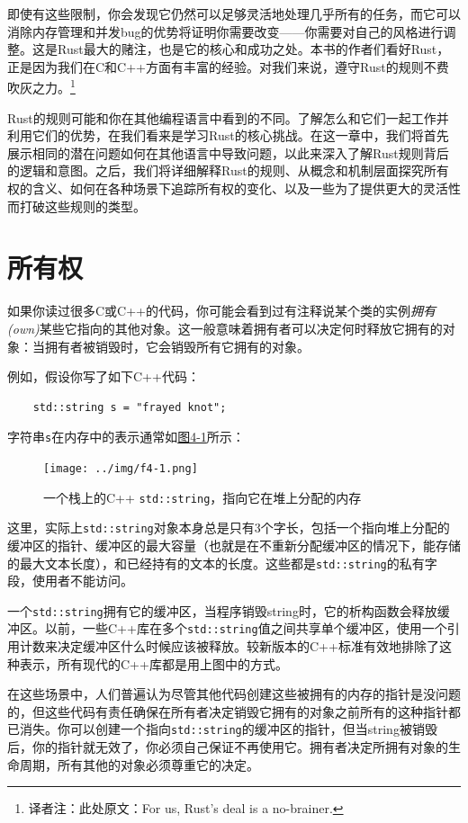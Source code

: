 即使有这些限制，你会发现它仍然可以足够灵活地处理几乎所有的任务，而它可以消除内存管理和并发bug的优势将证明你需要改变——你需要对自己的风格进行调整。这是Rust最大的赌注，也是它的核心和成功之处。本书的作者们看好Rust，正是因为我们在C和C++方面有丰富的经验。对我们来说，遵守Rust的规则不费吹灰之力。\footnote{译者注：此处原文：For us, Rust's deal is a no-brainer.}

Rust的规则可能和你在其他编程语言中看到的不同。了解怎么和它们一起工作并利用它们的优势，在我们看来是学习Rust的核心挑战。在这一章中，我们将首先展示相同的潜在问题如何在其他语言中导致问题，以此来深入了解Rust规则背后的逻辑和意图。之后，我们将详细解释Rust的规则、从概念和机制层面探究所有权的含义、如何在各种场景下追踪所有权的变化、以及一些为了提供更大的灵活性而打破这些规则的类型。

\section{所有权}

如果你读过很多C或C++的代码，你可能会看到过有注释说某个类的实例\emph{拥有(own)}某些它指向的其他对象。这一般意味着拥有者可以决定何时释放它拥有的对象：当拥有者被销毁时，它会销毁所有它拥有的对象。

例如，假设你写了如下C++代码：
\begin{verbatim}
    std::string s = "frayed knot";
\end{verbatim}

字符串\texttt{s}在内存中的表示通常如\hyperref[f4-1]{图4-1}所示：
\begin{figure}
    \centering
    \texttt{[image: ../img/f4-1.png]}
    \caption{一个栈上的C++ \texttt{std::string}，指向它在堆上分配的内存}
    \label{f4-1}
\end{figure}

这里，实际上\texttt{std::string}对象本身总是只有3个字长，包括一个指向堆上分配的缓冲区的指针、缓冲区的最大容量（也就是在不重新分配缓冲区的情况下，能存储的最大文本长度），和已经持有的文本的长度。这些都是\texttt{std::string}的私有字段，使用者不能访问。

一个\texttt{std::string}拥有它的缓冲区，当程序销毁string时，它的析构函数会释放缓冲区。以前，一些C++库在多个\texttt{std::string}值之间共享单个缓冲区，使用一个引用计数来决定缓冲区什么时候应该被释放。较新版本的C++标准有效地排除了这种表示，所有现代的C++库都是用上图中的方式。

在这些场景中，人们普遍认为尽管其他代码创建这些被拥有的内存的指针是没问题的，但这些代码有责任确保在所有者决定销毁它拥有的对象之前所有的这种指针都已消失。你可以创建一个指向\texttt{std::string}的缓冲区的指针，但当string被销毁后，你的指针就无效了，你必须自己保证不再使用它。拥有者决定所拥有对象的生命周期，所有其他的对象必须尊重它的决定。

